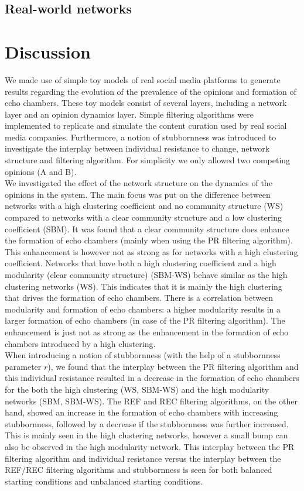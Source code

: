 \documentclass[11 pt , letterpaper , twoside , openright]{book}
\begin{document}
\section{Real-world networks}

\chapter{Discussion}

We made use of simple toy models of real social media platforms to generate results regarding the evolution of the prevalence of the opinions and formation of echo chambers. These toy models consist of several layers, including a network layer and an opinion dynamics layer. Simple filtering algorithms were implemented to replicate and simulate the content curation used by real social media companies. Furthermore, a notion of stubbornness was introduced to investigate the interplay between individual resistance to change, network structure and filtering algorithm. For simplicity we only allowed two competing opinions (A and B).\\
\newline
We investigated the effect of the network structure on the dynamics of the opinions in the system. The main focus was put on the difference between networks with a high clustering coefficient and no community structure (WS) compared to networks with a clear community structure and a low clustering coefficient (SBM). It was found that a clear community structure does enhance the formation of echo chambers (mainly when using the PR filtering algorithm). This enhancement is however not as strong as for networks with a high clustering coefficient. Networks that have both a high clustering coefficient and a high modularity (clear community structure) (SBM-WS) behave similar as the high clustering networks (WS). This indicates that it is mainly the high clustering that drives the formation of echo chambers. There is a correlation between modularity and formation of echo chambers: a higher modularity results in a larger formation of echo chambers (in case of the PR filtering algorithm). The enhancement is just not as strong as the enhancement in the formation of echo chambers introduced by a high clustering. \\
\newline
When introducing a notion of stubbornness (with the help of a stubbornness parameter $r$), we found that the interplay between the PR filtering algorithm and this individual resistance resulted in a decrease in the formation of echo chambers for the both the high clustering (WS, SBM-WS) and the high modularity networks (SBM, SBM-WS). The REF and REC filtering algorithms, on the other hand, showed an increase in the formation of echo chambers with increasing stubbornness, followed by a decrease if the stubbornness was further increased. This is mainly seen in the high clustering networks, however a small bump can also be observed in the high modularity network. This interplay between the PR filtering algorithm and individual resistance versus the interplay between the REF/REC filtering algorithms and stubbornness is seen for both balanced starting conditions and unbalanced starting conditions.\\
\end{document}
